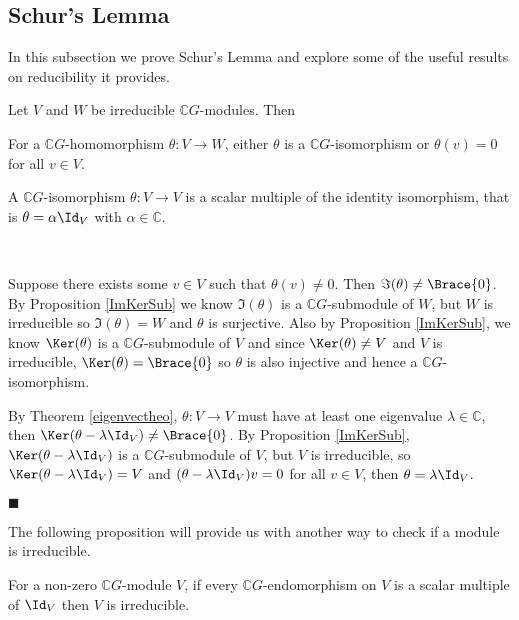 \documentclass[../Project.tex]{subfiles}
\begin{document}
\newpage
\subsection{Schur's Lemma}
In this subsection we prove Schur's Lemma and explore some of the useful results on reducibility it provides.
\begin{lemm}
	Let $V$ and $W$ be irreducible $\mathbb{C}G$-modules. Then
	\begin{menum}
		\item For a $\mathbb{C}G$-homomorphism $\theta : V \to W$, either $\theta$ is a $\mathbb{C}G$-isomorphism or $\theta(v) = 0$ for all $v \in V$.
		\item A $\mathbb{C}G$-isomorphism $\theta : V \to V$ is a scalar multiple of the identity isomorphism, that is $\theta = \alpha \Id_V$ with $\alpha \in \mathbb{C}$.
	\end{menum}
\end{lemm}

\begin{proo*}~ %
\vspace{-\topsep}
\begin{menum}
	\item Suppose there exists some $v \in V$ such that $\theta(v) \neq 0$. Then $\Im(\theta) \neq \Brace{0}$. By Proposition \ref{ImKerSub} we know $\Im(\theta)$ is a $\mathbb{C}G$-submodule of $W$, but $W$ is irreducible so $\Im(\theta) = W$ and $\theta$ is surjective. Also by Proposition \ref{ImKerSub}, we know $\Ker(\theta)$ is a $\mathbb{C}G$-submodule of $V$ and since $\Ker(\theta) \neq V$ and $V$ is irreducible, $\Ker(\theta) = \Brace{0}$ so $\theta$ is also injective and hence a $\mathbb{C}G$-isomorphism.
	\item By Theorem \ref{eigenvectheo}, $\theta : V \to V$ must have at least one eigenvalue $\lambda \in \mathbb{C}$, then $\Ker(\theta - \lambda\Id_V) \neq \Brace{0}$. By Proposition \ref{ImKerSub}, $\Ker(\theta - \lambda\Id_V)$ is a $\mathbb{C}G$-submodule of $V$, but $V$ is irreducible, so $\Ker(\theta - \lambda\Id_V) = V$ and $(\theta - \lambda\Id_V)v = 0$ for all $v \in V$, then $\theta = \lambda\Id_V$.
\end{menum}
 \hfill$\blacksquare$\\
\end{proo*}


The following proposition will provide us with another way to check if a module is irreducible.
\begin{prop}[{\cite[Proposition 9.2]{2}}]
	For a non-zero $\mathbb{C}G$-module $V$, if every $\mathbb{C}G$-endomorphism on $V$ is a scalar multiple of $\Id_V$ then $V$ is irreducible.
\end{prop}
\end{document}
